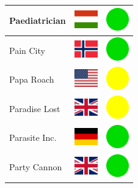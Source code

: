 \documentclass[12pt, a4paper, twoside]{report}
\begin{document}
\begin{center}
\begin{longtable}{|p{5cm}|p{2cm}|p{2cm}|}
 Paediatrician                                              & \includegraphics[width=1cm]{../img/flags/hu} &   \includegraphics[width=1cm]{../likes/y} \\ \hline
 Pain City                                                  & \includegraphics[width=1cm]{../img/flags/no} &   \includegraphics[width=1cm]{../likes/y} \\ \hline
 Papa Roach                                                 & \includegraphics[width=1cm]{../img/flags/us} &   \includegraphics[width=1cm]{../likes/m} \\ \hline
 Paradise Lost                                              & \includegraphics[width=1cm]{../img/flags/gb} &   \includegraphics[width=1cm]{../likes/m} \\ \hline
 Parasite Inc.                                              & \includegraphics[width=1cm]{../img/flags/de} &   \includegraphics[width=1cm]{../likes/y} \\ \hline
 Party Cannon                                               & \includegraphics[width=1cm]{../img/flags/gb} &   \includegraphics[width=1cm]{../likes/y} \\ \hline

\end{longtable}
\end{center}
\end{document}
